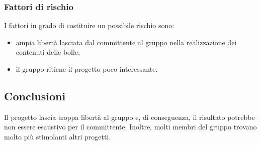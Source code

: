 		\subsubsection {Fattori di rischio}
		I fattori in grado di costituire un possibile rischio sono:
			\begin{itemize}
				\item ampia libertà lasciata dal committente al gruppo nella realizzazione dei contenuti delle bolle;		
				\item il gruppo ritiene il progetto poco interessante.
			\end{itemize}
	\subsection {Conclusioni}
		Il progetto lascia troppa libertà al gruppo e, di conseguenza, il risultato potrebbe non essere esaustivo per il committente. Inoltre, molti membri del gruppo trovano molto più stimolanti altri progetti.
	